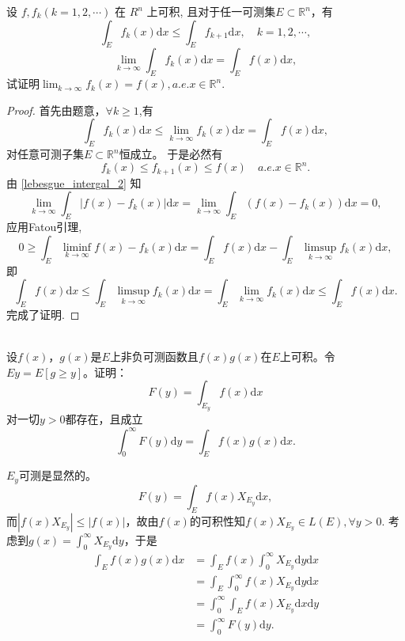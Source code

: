 \begin{exercise}
设 $f,f_k(k=1,2,\cdots)$ 在 $R^n$ 上可积, 且对于任一可测集$E\subset\mathbb{R}^n$，有
$$\int_Ef_k(x)\mathrm{d}x\leq\int_Ef_{k+1}\mathrm{d}x,\quad k=1,2,\cdots,$$
$$\lim_{k\to\infty}\int_Ef_k(x)\mathrm{d}x=\int_Ef(x)\mathrm{d}x,$$
试证明$\lim_{k\to\infty}f_k(x)=f(x),a.e.x\in\mathbb{R}^n.$

\begin{proof}
首先由题意，$\forall k\geq1$,有
$$\int_Ef_k(x)\mathrm{d}x\leq\lim_{k\to\infty}f_k(x)\mathrm{d}x=\int_Ef(x)\mathrm{d}x,$$对任意可测子集$E\subset\mathbb{R}^n$恒成立。
于是必然有
\begin{equation}\label{lebesgue_intergal_2}
f_k(x)\leq f_{k+1}(x) \leq f(x)\quad a.e.x\in\mathbb{R}^n.
\end{equation}
由 \eqref{lebesgue_intergal_2} 知
\[
  \lim_{k\to\infty}\int_E|f(x)-f_k(x)|\mathrm{d}x
  = \lim_{k\to\infty} \int_E(f(x)-f_k(x))\mathrm{d}x = 0,
\]
应用Fatou引理,
\[
0\geq\int_E\liminf_{k\to\infty}f(x)-f_k(x)\mathrm{d}x=\int_Ef(x)\mathrm{d}x-\int_E\limsup_{k\to\infty}f_k(x)\mathrm{d}x,
\]
即 
\[
\int_Ef(x)\mathrm{d}x
\leq\int_E\limsup_{k\to\infty}f_k(x)\mathrm{d}x
= \int_E\lim_{k\to\infty}f_k(x)\mathrm{d}x
\leq\int_Ef(x)\mathrm{d}x.
\] 
完成了证明.
\end{proof}
\end{exercise}

\begin{exercise}
\hfill\\
设$f(x)$，$g(x)$是$E$上非负可测函数且$f(x)g(x)$在$E$上可积。令$Ey=E[g\geq y]$。证明：$$F(y)=\int_{E_y}f(x)\mathrm{d}x$$对一切$y>0$都存在，且成立
$$\int_0^{\infty}F(y)\mathrm{d}y=\int_Ef(x)g(x)\mathrm{d}x.$$

$E_y$可测是显然的。$$F(y)=\int_Ef(x)X_{E_y}\mathrm{d}x,$$
而$|f(x)X_{E_y}|\leq|f(x)|$，故由$f(x)$的可积性知$f(x)X_{E_y}\in L(E),\forall y>0.$
考虑到$g(x)=\int_0^{\infty}X_{E_y}\mathrm{d}y$，于是
\begin{align*}
\int_Ef(x)g(x)\mathrm{d}x&=\int_Ef(x)\int_0^{\infty}X_{E_y}\mathrm{d}y\mathrm{d}x\\
&=\int_E\int_0^{\infty}f(x)X_{E_y}\mathrm{d}y\mathrm{d}x\\
&=\int_0^{\infty}\int_Ef(x)X_{E_y}\mathrm{d}x\mathrm{d}y\\
&=\int_0^{\infty}F(y)\mathrm{d}y.\\
\end{align*}

\end{exercise}


